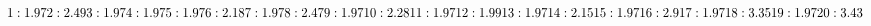 
$1: 1.97\\
2: 2.49\\
3: 1.97\\
4: 1.97\\
5: 1.97\\
6: 2.18\\
7: 1.97\\
8: 2.47\\
9: 1.97\\
10: 2.28\\
11: 1.97\\
12: 1.99\\
13: 1.97\\
14: 2.15\\
15: 1.97\\
16: 2.9\\
17: 1.97\\
18: 3.35\\
19: 1.97\\
20: 3.43$